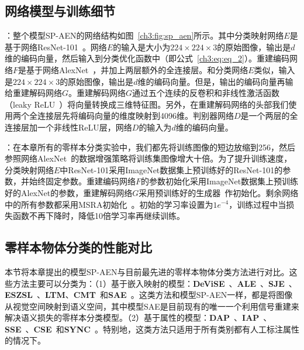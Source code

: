 \subsection{网络模型与训练细节}
\textbf{}：整个模型SP-AEN的网络结构如图~\ref{ch3:fig:sp_aen}所示。其中分类映射网络$E$是基于网络ResNet-101~\cite{he2016deep}。网络$E$的输入是大小为$224\times224\times3$的原始图像，输出是$d$维的编码向量，然后输入到分类优化函数中（即公式~\eqref{ch3:eq:eq_2}）。重建编码网络$F$是基于网络AlexNet~\cite{krizhevsky2012imagenet}，并加上两层额外的全连接层。和分类网络$E$类似，输入是$224\times224\times3$的原始图像，输出是$d$维的编码向量。但是，输出的编码向量再输给重建解码网络$G$。重建解码网络$G$通过五个连续的反卷积和非线性激活函数（leaky ReLU~\cite{he2015delving}）将向量转换成三维特征图。另外，在重建解码网络的头部我们使用两个全连接层先将编码向量的维度映射到4096维。判别器网络$D$是一个两层的全连接层加一个非线性ReLU层，网络$D$的输入为$d$维的编码向量。

\textbf{}：在本章所有的零样本分类实验中，我们都先将训练图像的短边放缩到256，然后参照网络AlexNet~\cite{krizhevsky2012imagenet}的数据增强策略将训练集图像增大十倍。为了提升训练速度，分类映射网络$E$中ResNet-101采用ImageNet数据集上预训练好的ResNet-101的参数，并始终固定参数。重建编码网络$F$的参数初始化采用ImageNet数据集上预训练好的AlexNet的参数，重建解码网络$G$采用预训练好的生成器~\cite{dosovitskiy2016generating}作初始化。剩余网络中的所有参数都采用MSRA初始化~\cite{he2015delving}。初始的学习率设置为$1e^{-4}$，训练过程中当损失函数不再下降时，降低10倍学习率再继续训练。


\subsection{零样本物体分类的性能对比}
本节将本章提出的模型SP-AEN与目前最先进的零样本物体分类方法进行对比。这些方法主要可以分类为：（1）基于嵌入映射的模型：\textbf{DeViSE}~\cite{frome2013devise}、\textbf{ALE}~\cite{akata2015label}、\textbf{SJE}~\cite{akata2015evaluation}、\textbf{ESZSL}~\cite{romera2015embarrassingly}、\textbf{LTM}\cite{xian2016latent}、\textbf{CMT}~\cite{socher2013zero}和\textbf{SAE}~\cite{kodirov2017semantic}。这类方法和模型SP-AEN一样，都是将图像从视觉空间映射到语义空间，其中模型SAE是目前现有的唯一一个利用信号重建来解决语义损失的零样本分类模型。（2）基于属性的模型：\textbf{DAP}~\cite{lampert2009learning}、\textbf{IAP}~\cite{lampert2009learning}、\textbf{SSE}~\cite{zhang2015zero}、\textbf{CSE}~\cite{norouzi2014zero}和\textbf{SYNC}~\cite{changpinyo2016synthesized}。特别地，这类方法只适用于所有类别都有人工标注属性的情况下。


